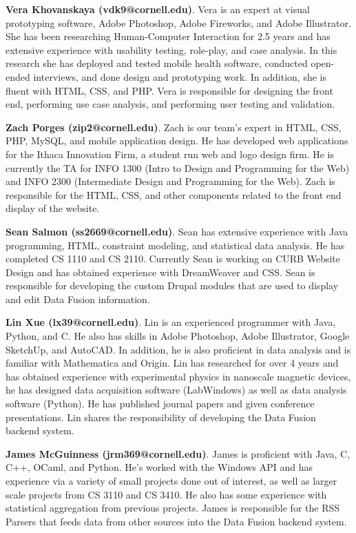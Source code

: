 \documentclass[10pt]{article} %
\begin{document}
\textbf{Vera Khovanskaya (vdk9@cornell.edu)}. Vera is an expert at visual prototyping software, Adobe Photoshop, Adobe Fireworks, and Adobe Illustrator. She has been researching Human-Computer Interaction for 2.5 years and has extensive experience with usability testing, role-play, and case analysis. In this research she has deployed and tested mobile health software, conducted open-ended interviews, and done design and prototyping work. In addition, she is fluent with HTML, CSS, and PHP. Vera is responsible for designing the front end, performing use case analysis, and performing user testing and validation. 

\textbf{Zach Porges (zip2@cornell.edu)}. Zach is our team’s expert in HTML, CSS, PHP, MySQL, and mobile application design. He has developed web applications for the Ithaca Innovation Firm, a student run web and logo design firm. He is currently the TA for INFO 1300 (Intro to Design and Programming for the Web) and INFO 2300 (Intermediate Design and Programming for the Web). Zach is responsible for the HTML, CSS, and other components related to the front end display of the website.

\textbf{Sean Salmon (ss2669@cornell.edu)}. Sean has extensive experience with Java programming, HTML, constraint modeling, and statistical data analysis. He has completed CS 1110 and CS 2110. Currently Sean is working on CURB Website Design and has obtained experience with DreamWeaver and CSS. Sean is responsible for developing the custom Drupal modules that are used to display and edit Data Fusion information.

\textbf{Lin Xue (lx39@cornell.edu)}. Lin is an experienced programmer with Java, Python, and C. He also has skills in Adobe Photoshop, Adobe Illustrator, Google SketchUp, and AutoCAD. In addition, he is also proficient in data analysis and is familiar with Mathematica and Origin. Lin has researched for over 4 years and has obtained experience with experimental physics in nanoscale magnetic devices, he has designed data acquisition software (LabWindows) as well as data analysis software (Python). He has published journal papers and given conference presentations. Lin shares the responsibility of developing the Data Fusion backend system.

\textbf{James McGuinness (jrm369@cornell.edu)}. James is proficient with Java, C, C++, OCaml, and Python. He’s worked with the Windows API and has experience via a variety of small projects done out of interest, as well as larger scale projects from CS 3110 and CS 3410. He also has some experience with statistical aggregation from previous projects. James is responsible for the RSS Parsers that feeds data from other sources into the Data Fusion backend system.
\end{document}
